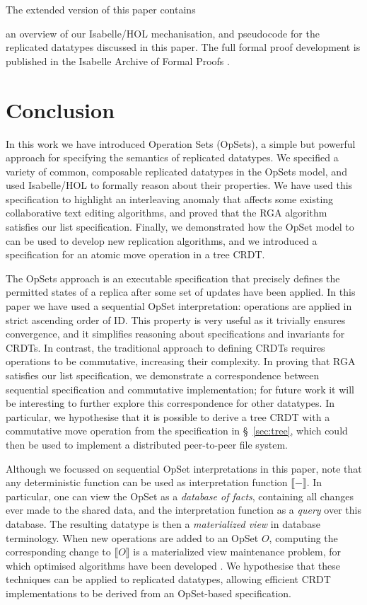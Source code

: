 \documentclass[a4paper,english]{lipics-v2018}
\newif\ifarxiv
\begin{document}
\ifarxiv
  The appendices contain
\else
  The extended version of this paper \cite{ExtendedVersion} contains
\fi
an overview of our Isabelle/HOL mechanisation, and pseudocode for the replicated datatypes discussed in this paper.
The full formal proof development is published in the Isabelle Archive of Formal Proofs \cite{AFP}.







\section{Conclusion}

In this work we have introduced Operation Sets (OpSets), a simple but powerful approach for specifying the semantics of replicated datatypes.
We specified a variety of common, composable replicated datatypes in the OpSets model, and used Isabelle/HOL to formally reason about their properties.
We have used this specification to highlight an interleaving anomaly that affects some existing collaborative text editing algorithms, and proved that the RGA algorithm satisfies our list specification.
Finally, we demonstrated how the OpSet model to can be used to develop new replication algorithms, and we introduced a specification for an atomic move operation in a tree CRDT.

The OpSets approach is an executable specification that precisely defines the permitted states of a replica after some set of updates have been applied.
In this paper we have used a sequential OpSet interpretation: operations are applied in strict ascending order of ID.
This property is very useful as it trivially ensures convergence, and it simplifies reasoning about specifications and invariants for CRDTs.
In contrast, the traditional approach to defining CRDTs requires operations to be commutative, increasing their complexity.
In proving that RGA satisfies our list specification, we demonstrate a correspondence between sequential specification and commutative implementation; for future work it will be interesting to further explore this correspondence for other datatypes.
In particular, we hypothesise that it is possible to derive a tree CRDT with a commutative move operation from the specification in \S~\ref{sec:tree}, which could then be used to implement a distributed peer-to-peer file system.

Although we focussed on sequential OpSet interpretations in this paper, note that any deterministic function can be used as interpretation function $\llbracket-\rrbracket$.
In particular, one can view the OpSet as a \emph{database of facts}, containing all changes ever made to the shared data, and the interpretation function as a \emph{query} over this database.
The resulting datatype is then a \emph{materialized view} in database terminology.
When new operations are added to an OpSet $O$, computing the corresponding change to $\llbracket O \rrbracket$ is a materialized view maintenance problem, for which optimised algorithms have been developed \cite{Gupta:1999uz}.
We hypothesise that these techniques can be applied to replicated datatypes, allowing efficient CRDT implementations to be derived from an OpSet-based specification.
\end{document}
